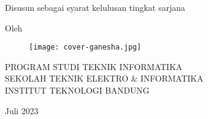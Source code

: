 \clearpage
\pagestyle{empty}

\begin{center}
	\smallskip

	\Large \bfseries \MakeUppercase{\thetitle}
	\vfill

	\subtitle
	\vfill

	\large Disusun sebagai syarat kelulusan tingkat sarjana
	\vfill

	\large Oleh

	\Large \theauthor

	\vfill
	\begin{figure}[h]
		\centering
		\texttt{[image: cover-ganesha.jpg]}
	\end{figure}
	\vfill

	\large
	\uppercase{
		Program Studi Teknik Informatika \\
		Sekolah Teknik Elektro \& Informatika \\
		Institut Teknologi Bandung
	}

	Juli 2023

\end{center}

\clearpage
